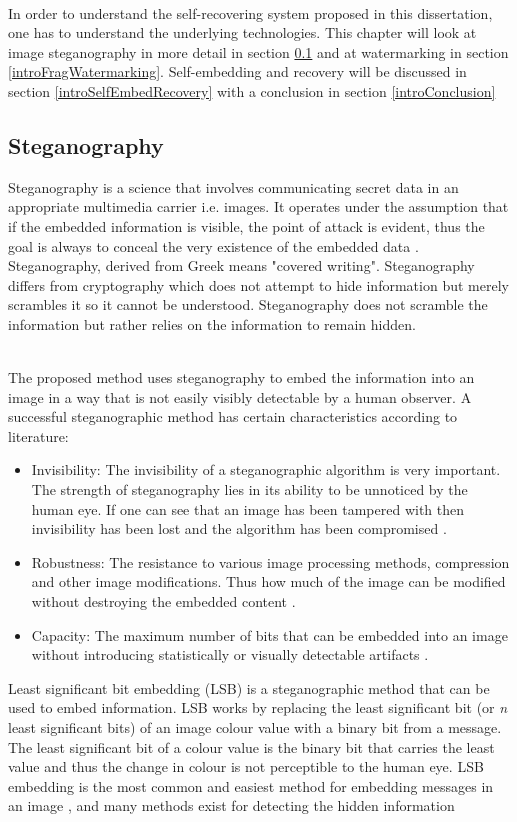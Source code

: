 \documentclass[12pt]{article}
\begin{document}
\hspace{0pt} \\
In order to understand the self-recovering system proposed in this dissertation, one has to understand the underlying technologies.  This chapter will look at image steganography in more detail in section \ref{introSteganography} and at watermarking in section \ref{introFragWatermarking}. Self-embedding and recovery will be discussed in section \ref{introSelfEmbedRecovery} with a conclusion in section \ref{introConclusion}

\subsection{Steganography}
\label{introSteganography}
Steganography is a science that involves communicating secret data in an appropriate multimedia carrier i.e. images. It operates under the assumption that if the embedded information is visible, the point of attack is evident, thus the goal is always to conceal the very existence of the embedded data \cite{cheddad2010digital}.
Steganography, derived from Greek means "covered writing".
Steganography differs from cryptography which does not attempt to hide information but merely scrambles it so it cannot be understood.
Steganography does not scramble the information but rather relies on the information to remain hidden.

\hspace{0pt} \\
The proposed method uses steganography to embed the information into an image in a way that is not easily visibly detectable by a human observer.
A successful steganographic method has certain characteristics according to literature:
\begin{itemize}
	\item Invisibility: The invisibility of a steganographic algorithm is very important. The strength of steganography lies in its ability to be unnoticed by the human eye. If one can see that an image has been tampered with then invisibility has been lost and the algorithm has been compromised \cite{morkel2005overview}.
	\item Robustness: The resistance to various image processing methods, compression and other image modifications. Thus how much of the image can be modified without destroying the embedded content \cite{cheddad2010digital}.
	\item Capacity: The maximum number of bits that can be embedded into an image without introducing statistically or visually detectable artifacts \cite{fridrich2009steganography}.
\end{itemize}
Least significant bit embedding (LSB) is a steganographic method that can be used to embed information. 
LSB works by replacing the least significant bit (or \textit{n} least significant bits) of an image colour value with a binary bit from a message. The least significant bit of a colour value is the binary bit that carries the least value and thus the change in colour is not perceptible to the human eye.
LSB embedding is the most common and easiest method for embedding messages in an image \cite{lee2000high}, and many methods exist for detecting the hidden information 
\end{document}
